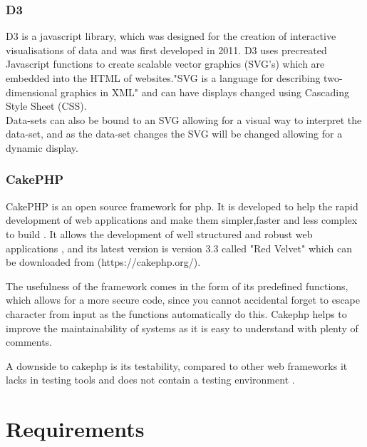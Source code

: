 \documentclass[12pt]{article}  %
\begin{document}
\subsubsection{D3}
D3 \cite{bostock_d3.js_nodate} is a javascript library, which was designed for the creation of interactive visualisations of data and was first developed in 2011. D3 uses precreated Javascript functions to create scalable vector graphics (SVG's) which are embedded into the HTML of websites."SVG is a language for describing two-dimensional graphics in XML"\cite{ferraiolo_scalable_2000} and can have displays changed  using Cascading Style Sheet (CSS).  \\
Data-sets can also be bound to an SVG allowing for a visual way to interpret the data-set, and as the data-set changes the SVG will be changed allowing for a dynamic display.



\subsubsection{CakePHP}
CakePHP is an open source framework for php. It is developed to help the rapid development of web applications and make them simpler,faster and less complex to build \cite{noauthor_cakephp_nodate}. It allows the development of well structured and robust web applications \cite{plekhanova_evaluating_2009}, and its latest version is version 3.3 called "Red Velvet" which can be downloaded from (https://cakephp.org/).

The usefulness of the framework comes in the form of its predefined functions, which allows for a more secure code, since you cannot accidental forget to escape character from input as the functions automatically do this. Cakephp helps to improve the maintainability of systems as it is easy to understand with plenty of comments.

A downside to cakephp is its testability, compared to other web frameworks it lacks in testing tools and does not contain a testing environment \cite{plekhanova_evaluating_2009}.





\newpage
\section{Requirements}\label{section:require}
 
\end{document}
